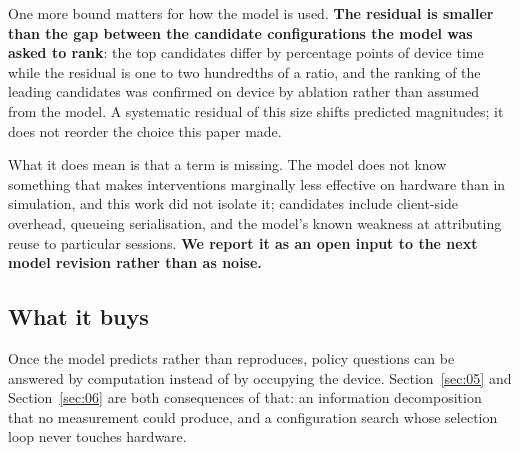 One more bound matters for how the model is used. \textbf{The residual is smaller than the gap between the candidate configurations the model was asked to rank}: the top candidates differ by percentage points of device time while the residual is one to two hundredths of a ratio, and the ranking of the leading candidates was confirmed on device by ablation rather than assumed from the model. A systematic residual of this size shifts predicted magnitudes; it does not reorder the choice this paper made.

What it does mean is that a term is missing. The model does not know something that makes interventions marginally less effective on hardware than in simulation, and this work did not isolate it; candidates include client-side overhead, queueing serialisation, and the model's known weakness at attributing reuse to particular sessions. \textbf{We report it as an open input to the next model revision rather than as noise.}

\subsection{What it buys}

Once the model predicts rather than reproduces, policy questions can be answered by computation instead of by occupying the device. Section~\ref{sec:05} and Section~\ref{sec:06} are both consequences of that: an information decomposition that no measurement could produce, and a configuration search whose selection loop never touches hardware.
